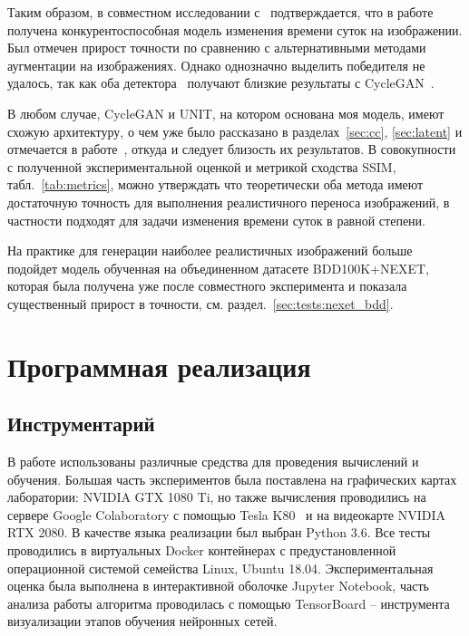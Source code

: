 \documentclass[11pt,a4paper]{extarticle}
\begin{document}
{				Таким образом, в совместном исследовании с~\cite{disser_aug} подтверждается, что в работе получена конкурентоспособная модель изменения времени суток на изображении.
				Был отмечен прирост точности по сравнению с альтернативными методами аугментации на изображениях.
				Однако однозначно выделить победителя не удалось, так как оба детектора~\cite{detector:faster-r-cnn,detector:retina-net} получают близкие результаты с CycleGAN~\cite{CycleGAN}.
				
				В любом случае, CycleGAN и UNIT, на котором основана моя модель, имеют схожую архитектуру, о чем уже было рассказано в разделах~\ref{sec:cc}, \ref{sec:latent} и отмечается в работе~\cite{UNIT_vs_CycleGAN}, откуда и следует близость их результатов.
				В совокупности с полученной экспериментальной оценкой и метрикой сходства SSIM, табл.~\ref{tab:metrics}, можно утверждать что теоретически оба метода имеют достаточную точность для выполнения реалистичного переноса изображений, в частности подходят для задачи изменения времени суток в равной степени.
				
				На практике для генерации наиболее реалистичных изображений больше подойдет модель обученная на объединенном датасете BDD100K+NEXET, которая была получена уже после совместного эксперимента и показала существенный прирост в точности, см. раздел.~\ref{sec:tests:nexet_bdd}.


\newpage
\section{Программная реализация}\label{sec:prac}

	\subsection{Инструментарий}\label{sec:tools}

		В работе использованы различные средства для проведения вычислений и обучения.
		Большая часть экспериментов была поставлена на графических картах лаборатории: NVIDIA GTX 1080 Ti, но также вычисления проводились на сервере Google Colaboratory с помощью Tesla K80~\cite{colab} и на видеокарте NVIDIA RTX 2080.
		В качестве языка реализации был выбран Python 3.6.
		Все тесты проводились в виртуальных Docker контейнерах с предустановленной операционной системой семейства Linux, Ubuntu 18.04.
		Экспериментальная оценка была выполнена в интерактивной оболочке Jupyter Notebook, часть анализа работы алгоритма проводилась с помощью TensorBoard -- инструмента визуализации этапов обучения нейронных сетей.

}
\end{document}
